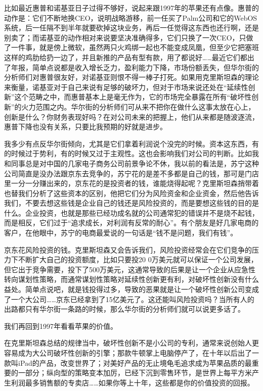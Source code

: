 比如最近惠普和诺基亚日子过得不够好，说起来跟1997年的苹果还有点像。惠普的动作是：它们不断地换CEO，说明战略游移，前一任买了Palm公司和它的WebOS系统，后一任隔不到半年就要砍掉这块业务，再后一任觉得这东西也还行啊，还是别卖了；而诺基亚的动作相对来说要坚决准确得多，它们只换了一次CEO，只做了一件事，就是傍上微软，虽然两只火鸡绑一起也不能变成凤凰，但至少它把塞班这样的鸡肋给扔一边了，并且新推的产品有型有款，用了都说好\ldots\ldots 最近它们都出了年报，简单点说都是收入增长乏力，盈利能力下降，市场份额丢失，但华尔街的分析师们对惠普很友好，对诺基亚则恨不得一棒子打死。如果用克里斯坦森的理论来衡量，诺基亚对于自己来说有足够的破坏力，但对于市场来说还处在``延续性创新''这个范畴之中，而惠普基本上是毫无作为，它的市场完全暴露在所有``破坏性创新''的火力范围之内。华尔街的分析师们可从来不把你在做什么这事太放在心上，创新是什么？你财务表现好吗？在对公司未来的把握上，他们从来都是随波逐流，惠普下降也没有关系，只要比我预期的好就是进步。

我多少有点反华尔街倾向，尤其是它们拿着利润说个没完的时候。资本这东西，有的时候过于势利，有的时候又过于主观性。这也会影响我们对公司的判断。比如我和同事总是对中国的几家电子商务公司前景争论不休，我以前的看法是，苏宁这种公司简直是没办法跟京东去竞争的，苏宁花的是差不多都是自己的钱，那可是门店里一分一分赚出来的，京东花的是投资者的钱，谁能烧得起呢？克里斯坦森捎带着也替我们分析了这些资本的区别，他把它们分为风险资金和企业资金，然后他告诉我们，不要去想这些钱是企业自己的钱还是风险投资的，而是要想这些钱的目的是什么。企业投资，也就是那些已经功成名就的公司通常犯的错误并不是烧不起钱，而是相反，它们过于``追求成长，对利润有反常的耐心''。有个朋友是好几家电商的客户，在他眼中，苏宁的电商最爱说的一句话是``钱不是问题，我们有钱''。

京东花风险投资的钱。克里斯坦森又会告诉我们，风险投资经常会在它们竞争的压力下不断扩大自己的投资额度，比如只要投20
0万美元就可以保证一个公司发展，但它出于竞争需要，投下了500万美元，这通常导致的后果是让一个企业从应急性转向谋划性策略，而通常谋划性策略对延续性创新更有利，对破坏性创新没有什么益处。简单点说吧，就是钱投得过多，导致的恶果就是让一个破坏性创新公司变成了一个大公司\ldots\ldots 京东已经拿到了15亿美元了。这还能叫风险投资吗？当所有人的出路都只有华尔街一条路的时候，那么华尔街的分析师们就可以说更多话了。

我们再回到1997年看看苹果的价值。

在克里斯坦森总结的规律当中，破坏性创新不是小公司的专利，通常来说创始人更容易成为大公司破坏性创新的引擎；那款牛顿掌上电脑停产了，在十年以后出了一款叫iPad的产品，改变世界了；对美好产品的无止境龟毛追求成为苹果品质的最重要的一部分；纵向型的策略变本加厉，已经下沉到零售环节，是世界上每平方米产生利润最多销售额的专卖店\ldots\ldots 如果你等上十年，这些都是你的价值投资的回报。

